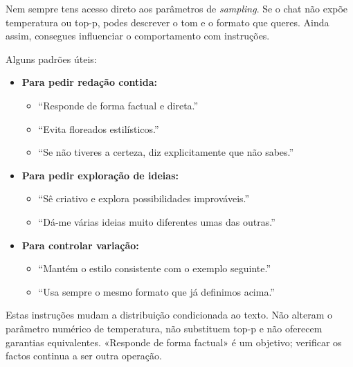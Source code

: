 Nem sempre tens acesso direto aos parâmetros de \emph{sampling}. Se o chat não expõe temperatura ou top-p, podes descrever o tom e o formato que queres. Ainda assim, consegues influenciar o comportamento com instruções.

Alguns padrões úteis:

\begin{itemize}[leftmargin=*]
\item \textbf{Para pedir redação contida:}
\begin{itemize}[leftmargin=*]
\item “Responde de forma factual e direta.”
\item “Evita floreados estilísticos.”
\item “Se não tiveres a certeza, diz explicitamente que não sabes.”
\end{itemize}
\item \textbf{Para pedir exploração de ideias:}
\begin{itemize}[leftmargin=*]
\item “Sê criativo e explora possibilidades improváveis.”
\item “Dá-me várias ideias muito diferentes umas das outras.”
\end{itemize}
\item \textbf{Para controlar variação:}
\begin{itemize}[leftmargin=*]
\item “Mantém o estilo consistente com o exemplo seguinte.”
\item “Usa sempre o mesmo formato que já definimos acima.”
\end{itemize}
\end{itemize}

Estas instruções mudam a distribuição condicionada ao texto. Não alteram o parâmetro numérico de temperatura, não substituem top-p e não oferecem garantias equivalentes. «Responde de forma factual» é um objetivo; verificar os factos continua a ser outra operação.

